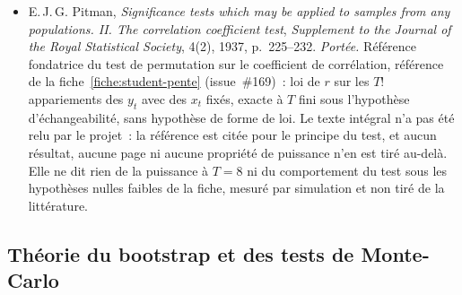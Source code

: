\documentclass[a4paper,11pt]{article}
\begin{document}
\begin{itemize}[itemsep=4pt]
  \item E.\,J.\,G. Pitman, \emph{Significance tests which may be applied to samples from any
  populations. II. The correlation coefficient test}, \emph{Supplement to the Journal of the
  Royal Statistical Society}, 4(2), 1937, p.~225--232.
  \emph{Portée.} Référence fondatrice du test de permutation sur le coefficient de
  corrélation, référence de la fiche~\ref{fiche:student-pente} (issue~\#169)~: loi
  de $r$ sur les $T!$ appariements des $y_t$ avec des $x_t$ fixés, exacte à $T$ fini sous
  l'hypothèse d'échangeabilité, sans hypothèse de forme de loi. Le texte intégral n'a pas été relu
  par le projet~: la référence est citée pour le principe du test, et aucun résultat, aucune page
  ni aucune propriété de puissance n'en est tiré au-delà. Elle ne dit rien de la puissance à
  $T = 8$ ni du comportement du test sous les hypothèses nulles faibles de la fiche, mesuré par
  simulation et non tiré de la littérature.
\end{itemize}

\subsection*{Théorie du bootstrap et des tests de Monte-Carlo}
\end{document}
